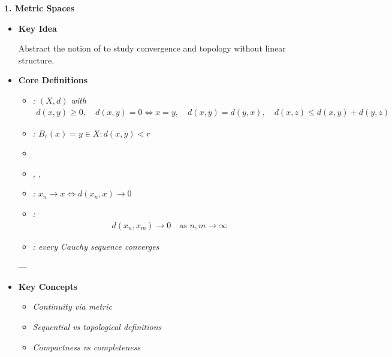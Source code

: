\documentclass[12pt,a4paper]{report}
\begin{document}
\begin{description}
\item \textbf{1. Metric Spaces}

    \begin{itemize}
    \item \textbf{Key Idea}

Abstract the notion of  to study convergence and topology without linear structure.

    \item \textbf{Core Definitions}

            \begin{itemize}
            \item \textit{: $(X,d)$ with}
\begin{align*}
  d(x,y)\ge 0,\quad d(x,y)=0 \iff x=y,\quad d(x,y)=d(y,x),\quad d(x,z)\le d(x,y)+d(y,z)
\end{align*}

            \item \textit{: $B_r(x)={y\in X: d(x,y)<r}$}

            \item \textit{}

            \item \textit{, , }

            \item \textit{: $x_n \to x \iff d(x_n,x)\to 0$}

            \item \textit{:}
\begin{align*}
  d(x_n,x_m)\to 0 \quad \text{as } n,m\to\infty
\end{align*}

            \item \textit{: every Cauchy sequence converges}
            \end{itemize}

---

    \item \textbf{Key Concepts}

            \begin{itemize}
            \item \textit{Continuity via metric}
            \item \textit{Sequential vs topological definitions}
            \item \textit{Compactness vs completeness}
            \end{itemize}


\end{itemize}
\end{description}
\end{document}

